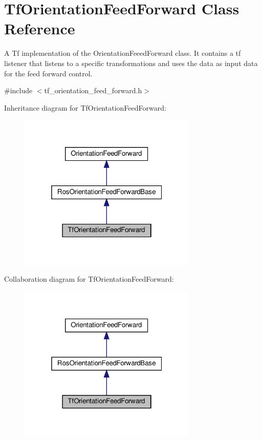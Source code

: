 \hypertarget{classTfOrientationFeedForward}{}\section{Tf\+Orientation\+Feed\+Forward Class Reference}
\label{classTfOrientationFeedForward}


A Tf implementation of the Orientation\+Feeed\+Forward class. It contains a tf listener that listens to a specific transformations and uses the data as input data for the feed forward control.  




{\ttfamily \#include $<$tf\+\_\+orientation\+\_\+feed\+\_\+forward.\+h$>$}



Inheritance diagram for Tf\+Orientation\+Feed\+Forward\+:\nopagebreak
\begin{figure}[H]
\begin{center}
\leavevmode
\includegraphics[width=241pt]{d3/d31/classTfOrientationFeedForward__inherit__graph}
\end{center}
\end{figure}


Collaboration diagram for Tf\+Orientation\+Feed\+Forward\+:\nopagebreak
\begin{figure}[H]
\begin{center}
\leavevmode
\includegraphics[width=241pt]{de/ddf/classTfOrientationFeedForward__coll__graph}
\end{center}
\end{figure}
